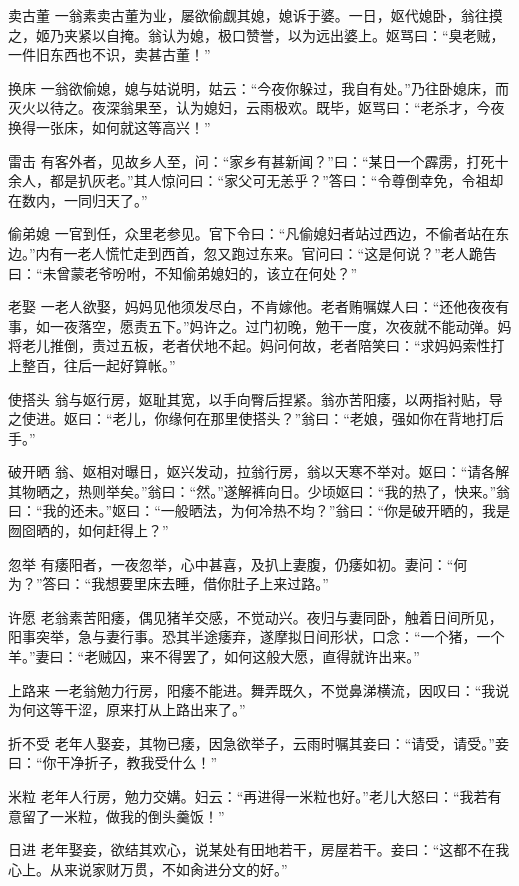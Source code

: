 \documentclass[12pt,UTF8]{ctexbook}
\begin{document}
卖古董
一翁素卖古董为业，屡欲偷觑其媳，媳诉于婆。一日，妪代媳卧，翁往摸之，姬乃夹紧以自掩。翁认为媳，极口赞誉，以为远出婆上。妪骂曰：“臭老贼，一件旧东西也不识，卖甚古董！”

换床
一翁欲偷媳，媳与姑说明，姑云：“今夜你躲过，我自有处。”乃往卧媳床，而灭火以待之。夜深翁果至，认为媳妇，云雨极欢。既毕，妪骂曰：“老杀才，今夜换得一张床，如何就这等高兴！”

雷击
有客外者，见故乡人至，问：“家乡有甚新闻？”曰：“某日一个霹雳，打死十余人，都是扒灰老。”其人惊问曰：“家父可无恙乎？”答曰：“令尊倒幸免，令祖却在数内，一同归天了。”

偷弟媳
一官到任，众里老参见。官下令曰：“凡偷媳妇者站过西边，不偷者站在东边。”内有一老人慌忙走到西首，忽又跑过东来。官问曰：“这是何说？”老人跪告曰：“未曾蒙老爷吩咐，不知偷弟媳妇的，该立在何处？”

老娶
一老人欲娶，妈妈见他须发尽白，不肯嫁他。老者贿嘱媒人曰：“还他夜夜有事，如一夜落空，愿责五下。”妈许之。过门初晚，勉干一度，次夜就不能动弹。妈将老儿推倒，责过五板，老者伏地不起。妈问何故，老者陪笑曰：“求妈妈索性打上整百，往后一起好算帐。”

使搭头
翁与妪行房，妪耻其宽，以手向臀后捏紧。翁亦苦阳痿，以两指衬贴，导之使进。妪曰：“老儿，你缘何在那里使搭头？”翁曰：“老娘，强如你在背地打后手。”

破开晒
翁、妪相对曝日，妪兴发动，拉翁行房，翁以天寒不举对。妪曰：“请各解其物晒之，热则举矣。”翁曰：“然。”遂解裤向日。少顷妪曰：“我的热了，快来。”翁曰：“我的还未。”妪曰：“一般晒法，为何冷热不均？”翁曰：“你是破开晒的，我是囫囵晒的，如何赶得上？”

忽举
有痿阳者，一夜忽举，心中甚喜，及扒上妻腹，仍痿如初。妻问：“何为？”答曰：“我想要里床去睡，借你肚子上来过路。”

许愿
老翁素苦阳痿，偶见猪羊交感，不觉动兴。夜归与妻同卧，触着日间所见，阳事突举，急与妻行事。恐其半途痿弃，遂摩拟日间形状，口念：“一个猪，一个羊。”妻曰：“老贼囚，来不得罢了，如何这般大愿，直得就许出来。”

上路来
一老翁勉力行房，阳痿不能进。舞弄既久，不觉鼻涕横流，因叹曰：“我说为何这等干涩，原来打从上路出来了。”

折不受
老年人娶妾，其物已痿，因急欲举子，云雨时嘱其妾曰：“请受，请受。”妾曰：“你干净折子，教我受什么！”

米粒
老年人行房，勉力交媾。妇云：“再进得一米粒也好。”老儿大怒曰：“我若有意留了一米粒，做我的倒头羹饭！”

日进
老年娶妾，欲结其欢心，说某处有田地若干，房屋若干。妾曰：“这都不在我心上。从来说家财万贯，不如肏进分文的好。”
\end{document}
